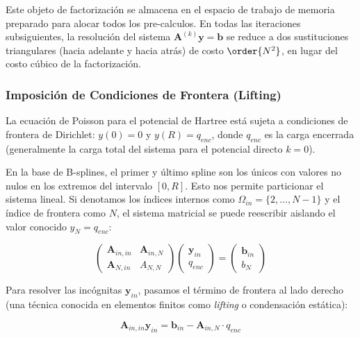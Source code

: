 Este objeto de factorización se almacena en el espacio de trabajo de memoria preparado para alocar todos los pre-calculos. En todas las iteraciones subsiguientes, la resolución del sistema \(\mathbf{A}^{(k)}\mathbf{y} = \mathbf{b}\) se reduce a dos sustituciones triangulares (hacia adelante y hacia atrás) de costo \( \order{N^2} \), en lugar del costo cúbico de la factorización.

\subsubsection{Imposición de Condiciones de Frontera (Lifting)}

La ecuación de Poisson para el potencial de Hartree está sujeta a condiciones de frontera de Dirichlet: \( y(0) = 0 \) y \( y(R) = q_{enc} \), donde \( q_{enc} \) es la carga encerrada (generalmente la carga total del sistema para el potencial directo \( k=0 \)).

En la base de B-splines, el primer y último spline son los únicos con valores no nulos en los extremos del intervalo \( [0, R] \). Esto nos permite particionar el sistema lineal. Si denotamos los índices internos como \( \Omega_{in} = \{2, \dots, N-1\} \) y el índice de frontera como \( N \), el sistema matricial se puede reescribir aislando el valor conocido \( y_N = q_{enc} \):

\begin{equation}
\begin{pmatrix}
\mathbf{A}_{in,in} & \mathbf{A}_{in,N} \\
\mathbf{A}_{N,in} & A_{N,N}
\end{pmatrix}
\begin{pmatrix}
\mathbf{y}_{in} \\
q_{enc}
\end{pmatrix}
=
\begin{pmatrix}
\mathbf{b}_{in} \\
b_N
\end{pmatrix}
\end{equation}

Para resolver las incógnitas \( \mathbf{y}_{in} \), pasamos el término de frontera al lado derecho (una técnica conocida en elementos finitos como \textit{lifting} o condensación estática):

\begin{equation}
\mathbf{A}_{in,in} \mathbf{y}_{in} = \mathbf{b}_{in} - \mathbf{A}_{in,N} \cdot q_{enc}
\end{equation}

